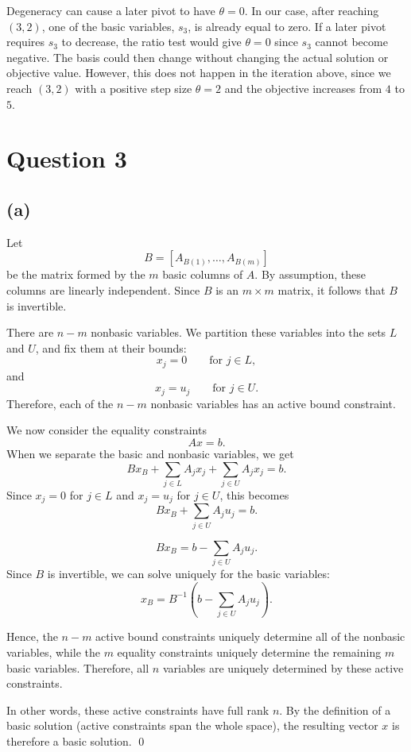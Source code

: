 \documentclass{article}
\begin{document}
Degeneracy can cause a later pivot to have $\theta=0$. In our case, after reaching $(3,2)$, one of the basic variables, $s_3$, is already equal to zero. If a later pivot requires $s_3$ to decrease, the ratio test would give $\theta=0$ since $s_3$ cannot become negative. The basis could then change without changing the actual solution or objective value. However, this does not happen in the iteration above, since we reach $(3,2)$ with a positive step size $\theta=2$ and the objective increases from $4$ to $5$.



\section*{Question 3}

\vspace{5mm}
\subsection*{(a)}
Let
\[
B = [A_{B(1)},\ldots,A_{B(m)}]
\]
be the matrix formed by the $m$ basic columns of $A$. By assumption,
these columns are linearly independent. Since $B$ is an $m\times m$
matrix, it follows that $B$ is invertible.

There are $n-m$ nonbasic variables. We partition these variables into
the sets $L$ and $U$, and fix them at their bounds:
\[
x_j = 0 \qquad \text{for } j\in L,
\]
and
\[
x_j = u_j \qquad \text{for } j\in U.
\]
Therefore, each of the $n-m$ nonbasic variables has an active bound
constraint.

We now consider the equality constraints
\[
Ax=b.
\]
When we separate the basic and nonbasic variables, we get
\[
Bx_B
+
\sum_{j\in L} A_j x_j
+
\sum_{j\in U} A_j x_j
=
b.
\]
Since $x_j=0$ for $j\in L$ and $x_j=u_j$ for $j\in U$, this becomes
\[
Bx_B+\sum_{j\in U}A_j u_j=b.
\]


\[
Bx_B
=
b-\sum_{j\in U}A_j u_j.
\]
Since $B$ is invertible, we can solve uniquely for the basic variables:
\[
x_B
=
B^{-1}
\left(
b-\sum_{j\in U}A_j u_j
\right).
\]

Hence, the $n-m$ active bound constraints uniquely determine all of the
nonbasic variables, while the $m$ equality constraints uniquely determine
the remaining $m$ basic variables. Therefore, all $n$ variables are
uniquely determined by these active constraints.

In other words, these active constraints have full rank $n$. By the
definition of a basic solution (active constraints span the whole space), the resulting vector $x$ is therefore
a basic solution. \qed
\end{document}
